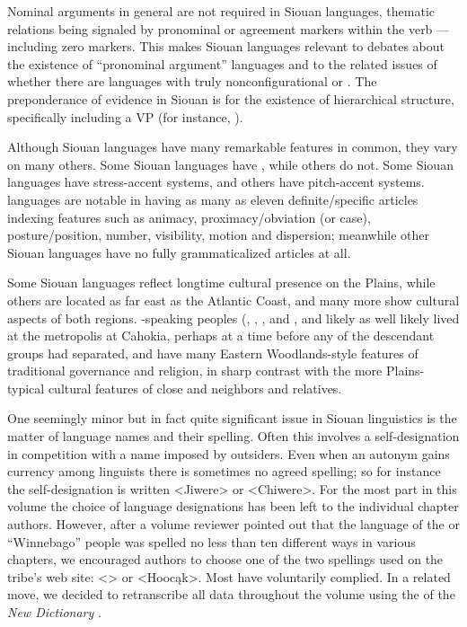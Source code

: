 \begin{refsection}
Nominal arguments in general are not required in Siouan languages, thematic relations being signaled by pronominal or agreement markers within the verb --- including zero markers. This makes Siouan languages relevant to debates about the existence of ``pronominal argument'' languages \citep{Jelinek1984} and to the related issues of whether there are languages with truly nonconfigurational or . The preponderance of evidence in Siouan is for the existence of hierarchical structure, specifically including a VP (for instance, \citealt{West2003,Johnson2016, JohnsonEtAl2016, Rosen2016}).


Although Siouan languages have many remarkable features in common, they vary on many others.  Some Siouan languages have , while others do not. Some Siouan languages have stress-accent systems, and others have pitch-accent systems.  languages are notable in having as many as eleven definite/specific articles indexing features such as animacy, proximacy/obviation (or case), posture/position, number, visibility, motion and dispersion; meanwhile other Siouan languages have no fully grammaticalized articles at all.


Some Siouan languages reflect longtime cultural presence on the Plains, while others are located as far east as the Atlantic Coast, and many more show cultural aspects of both regions. -speaking peoples (, , ,  and , and likely  as well \citep{Kasak2016,Koontz1995a} likely lived at the metropolis at Cahokia, perhaps at a time before any of the descendant groups had separated, and have many Eastern Woodlands-style features of traditional governance and religion, in sharp contrast with the more Plains-typical cultural features of close  and  neighbors and relatives.

One seemingly minor but in fact quite significant issue in Siouan linguistics is the matter of language names and their spelling. Often this involves a self-designation in competition with a name imposed by outsiders. Even when an autonym gains currency among linguists there is sometimes no agreed spelling; so for instance the  self-designation is written <Jiwere> or <Chiwere>. For the most part in this volume the choice of language designations has been left to the individual chapter authors. However, after a volume reviewer pointed out that the language of the  or ``Winnebago'' people was spelled no less than ten different ways in various chapters, we encouraged authors to choose one of the two spellings used on the tribe's web site:  <> or <Hooc\k{a}k>.  Most have voluntarily complied.  In a related move, we decided to retranscribe all  data throughout the volume using the  of the \textit{New  Dictionary} \citep{Ullrich2012}.


\end{refsection}
